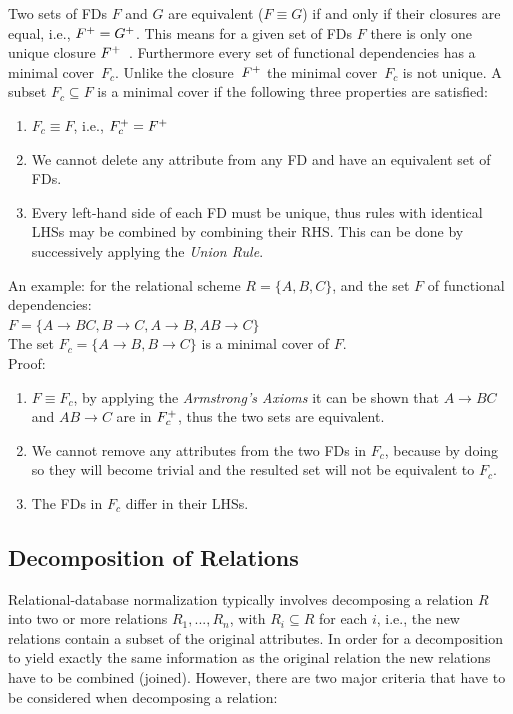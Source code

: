 Two sets of FDs $F$ and $G$ are equivalent ($F \equiv G$)
if and only if their closures are equal, i.e., $F\sp{+} = G\sp{+}$. 
This means for a given set of FDs $F$ there is 
only one unique closure $F\sp{+}$~\cite[Section 6.3.1]{bdb2}. Furthermore every set of functional dependencies 
has a minimal cover~$F_c$. Unlike the closure~$F\sp{+}$ the minimal cover~$F_c$ is not unique. 
A subset $F_c \subseteq F$ is a minimal cover if the following three
properties are satisfied:

\begin{enumerate}
  \item $F_c \equiv F$, i.e., $F\sb{c}\sp{+} = F\sp{+}$
  \item We cannot delete any attribute from any FD and have an equivalent set of FDs.
  \item Every left-hand side of each FD must be unique, thus
    rules with identical LHSs may be combined by combining their RHS.
    This can be done by successively applying the \textit{Union Rule}.
\end{enumerate}

An example: for the relational scheme $R = \{A, B, C\}$, and the set $F$ of functional dependencies: \\

$ F = \{A \rightarrow BC, B \rightarrow C, A \rightarrow B, AB \rightarrow C\}$ \\
\indent The set $F_c = \{A \rightarrow B, B \rightarrow C\}$ is a minimal cover of $F$. \\
\indent Proof:
\indent \begin{enumerate}
  \item $F \equiv F_c $, by applying the \textit{Armstrong's Axioms} it can be shown that $A \rightarrow BC$ and $AB \rightarrow C$ are in $F\sb{c}\sp{+}$, thus the two sets are equivalent.
  \item We cannot remove any attributes from the two FDs in $F_c$, because by doing so they will become trivial and the resulted set will not be equivalent to $F_c$.
  \item The FDs in $F_c$ differ in their LHSs. 
\end{enumerate}

\subsection{Decomposition of Relations}
\label{sec:decofrel}
Relational-database normalization typically involves decomposing a relation $R$
into two or more relations $R_1,...,R_n$, with $R_i \subseteq R$ for each $i$, i.e., the 
new relations contain a subset of the original attributes. 
In order for a decomposition to yield
exactly the same information as the original relation the new relations have to be
combined (joined). However, there are two major criteria that have to be considered when
decomposing a relation:


